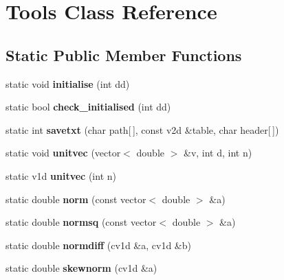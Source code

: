 \hypertarget{classTools}{}\section{Tools Class Reference}
\label{classTools}
\subsection*{Static Public Member Functions}
\begin{DoxyCompactItemize}
\item 
\mbox{\label{classTools_a730aa89785857069d813438484333e3f}} 
static void {\bfseries initialise} (int dd)
\item 
\mbox{\label{classTools_a70bfa2d87e96741ae906ba243f2eee49}} 
static bool {\bfseries check\+\_\+initialised} (int dd)
\item 
\mbox{\label{classTools_a9c06b648d86df4ecae99b1a76c4127c0}} 
static int {\bfseries savetxt} (char path\mbox{[}$\,$\mbox{]}, const v2d \&table, char header\mbox{[}$\,$\mbox{]})
\item 
\mbox{\label{classTools_afd9d226a408b455a011fee0d34ae8a3d}} 
static void {\bfseries unitvec} (vector$<$ double $>$ \&v, int d, int n)
\item 
\mbox{\label{classTools_ae8c955234ebf7119113a11f5f1991c7d}} 
static v1d {\bfseries unitvec} (int n)
\item 
\mbox{\label{classTools_a0d95ebcff879241382d186fb0a5bfdac}} 
static double {\bfseries norm} (const vector$<$ double $>$ \&a)
\item 
\mbox{\label{classTools_ab3641fd99870024f258997073ddcacc1}} 
static double {\bfseries normsq} (const vector$<$ double $>$ \&a)
\item 
\mbox{\label{classTools_ae3e8c7aa945f6d361afe386a5844984b}} 
static double {\bfseries normdiff} (cv1d \&a, cv1d \&b)
\item 
\mbox{\label{classTools_a0897d6c17e53b25e5fe597ae4c07a62e}} 
static double {\bfseries skewnorm} (cv1d \&a)
\item 

\end{DoxyCompactItemize}
